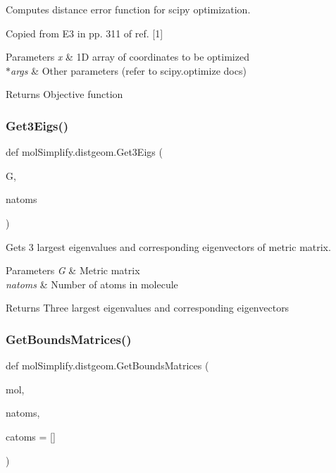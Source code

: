 Computes distance error function for scipy optimization. 

Copied from E3 in pp. 311 of ref. \mbox{[}1\mbox{]} 
\begin{DoxyParams}{Parameters}
{\em x} & 1D array of coordinates to be optimized \\
\hline
{\em $\ast$args} & Other parameters (refer to scipy.\+optimize docs) \\
\hline
\end{DoxyParams}
\begin{DoxyReturn}{Returns}
Objective function 
\end{DoxyReturn}
\mbox{\label{namespacemolSimplify_1_1distgeom_a2a9f4b671337bde3a1a15d9adef28959}} 
\subsubsection{\texorpdfstring{Get3\+Eigs()}{Get3Eigs()}}
{\footnotesize\ttfamily def mol\+Simplify.\+distgeom.\+Get3\+Eigs (\begin{DoxyParamCaption}\item[{}]{G,  }\item[{}]{natoms }\end{DoxyParamCaption})}



Gets 3 largest eigenvalues and corresponding eigenvectors of metric matrix. 


\begin{DoxyParams}{Parameters}
{\em G} & Metric matrix \\
\hline
{\em natoms} & Number of atoms in molecule \\
\hline
\end{DoxyParams}
\begin{DoxyReturn}{Returns}
Three largest eigenvalues and corresponding eigenvectors 
\end{DoxyReturn}
\mbox{\label{namespacemolSimplify_1_1distgeom_a4bc2fea7054e74224acf7455ef2457c2}} 
\subsubsection{\texorpdfstring{Get\+Bounds\+Matrices()}{GetBoundsMatrices()}}
{\footnotesize\ttfamily def mol\+Simplify.\+distgeom.\+Get\+Bounds\+Matrices (\begin{DoxyParamCaption}\item[{}]{mol,  }\item[{}]{natoms,  }\item[{}]{catoms = {\ttfamily \mbox{[}\mbox{]}} }\end{DoxyParamCaption})}



